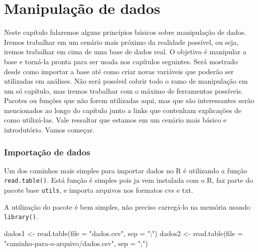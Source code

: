 \documentclass[
  letterpaper,
  DIV=11,
  numbers=noendperiod]{scrreprt}
\newenvironment{Shaded}{\begin{snugshade}}{\end{snugshade}}
\newcommand{\AttributeTok}[1]{\textcolor[rgb]{0.40,0.45,0.13}{#1}}
\newcommand{\FunctionTok}[1]{\textcolor[rgb]{0.28,0.35,0.67}{#1}}
\newcommand{\NormalTok}[1]{\textcolor[rgb]{0.00,0.23,0.31}{#1}}
\newcommand{\OtherTok}[1]{\textcolor[rgb]{0.00,0.23,0.31}{#1}}
\newcommand{\StringTok}[1]{\textcolor[rgb]{0.13,0.47,0.30}{#1}}
\begin{document}

\hypertarget{manipulauxe7uxe3o-de-dados}{%
\chapter{Manipulação de dados}\label{manipulauxe7uxe3o-de-dados}}

Neste capítulo falaremos alguns princípios básicos sobre manipulação de
dados. Iremos trabalhar em um cenário mais próximo da realidade
possível, ou seja, iremos trabalhar em cima de uma base de dados real. O
objetivo é manipular a base e torná-la pronta para ser usada nos
capítulos seguintes. Será mostrado desde como importar a base até como
criar novas variáveis que poderão ser utilizadas em análises. Não será
possível cobrir todo o ramo de manipulação em um só capítulo, mas iremos
trabalhar com o máximo de ferramentas possíveis. Pacotes ou funções que
não forem utilizadas aqui, mas que são interessantes serão mencionados
ao longo do capítulo junto a links que contenham explicações de como
utilizá-las. Vale ressaltar que estamos em um cenário mais básico e
introdutório. Vamos começar.

\hypertarget{importauxe7uxe3o-de-dados}{%
\subsection{Importação de dados}\label{importauxe7uxe3o-de-dados}}

Um dos caminhos mais simples para importar dados no R é utilizando a
função \texttt{read.table()}. Está função é simples pois ja vem
instalada com o R, faz parte do pacote base \texttt{utils}, e importa
arquivos nos formatos cvs e txt.

A utilização do pacote é bem simples, não preciso carregá-lo na memória
usando \texttt{library()}.

\begin{Shaded}
\begin{Highlighting}[]
\NormalTok{dados1 }\OtherTok{\textless{}{-}} \FunctionTok{read.table}\NormalTok{(}\AttributeTok{file =} \StringTok{"dados.csv"}\NormalTok{, }\AttributeTok{sep =} \StringTok{";"}\NormalTok{)}
\NormalTok{dados2 }\OtherTok{\textless{}{-}} \FunctionTok{read.table}\NormalTok{(}\AttributeTok{file =} \StringTok{"caminho{-}para{-}o{-}arquivo/dados.csv"}\NormalTok{, }\AttributeTok{sep =} \StringTok{";"}\NormalTok{)}
\end{Highlighting}
\end{Shaded}
\end{document}
